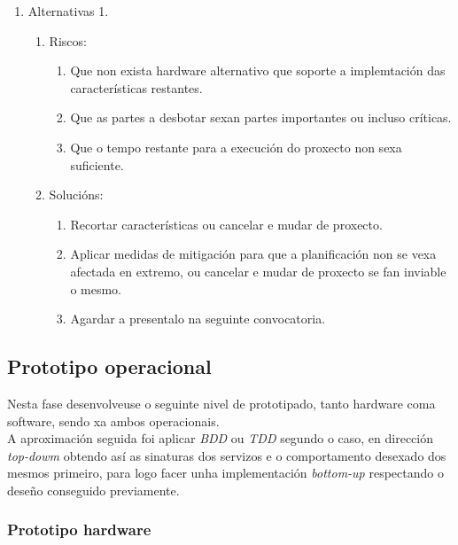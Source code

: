  \begin{enumerate}
  \item Alternativas 1.
        \begin{enumerate}
         \item Riscos:
               \begin{enumerate}
                \item Que non exista hardware alternativo que soporte a
                      implemtación das características restantes.
                \item Que as partes a desbotar sexan partes importantes ou
                      incluso críticas.
                \item Que o tempo restante para a execución do proxecto non
                      sexa suficiente.
               \end{enumerate}
         \item Solucións:
               \begin{enumerate}
                \item Recortar características ou cancelar e mudar de proxecto.
                \item Aplicar medidas de mitigación para que a planificación
                      non se vexa afectada en extremo, ou cancelar e mudar de
                      proxecto se fan inviable o mesmo.
                \item Agardar a presentalo na seguinte convocatoria.
               \end{enumerate}
        \end{enumerate}
 \end{enumerate}

 \subsection{Prototipo operacional}
 
 Nesta fase desenvolveuse o seguinte nivel de prototipado, tanto hardware coma
 software, sendo xa ambos operacionais. \\
 
 A aproximación seguida foi aplicar \textit{BDD} \cite{BDD} ou \textit{TDD}
 \cite{TDD} segundo o caso, en dirección \textit{top-dowm} obtendo así as
 sinaturas dos servizos e o comportamento desexado dos mesmos primeiro, para
 logo facer unha implementación \textit{bottom-up} respectando o deseño
 conseguido previamente.

  \subsubsection{Prototipo hardware}
  
